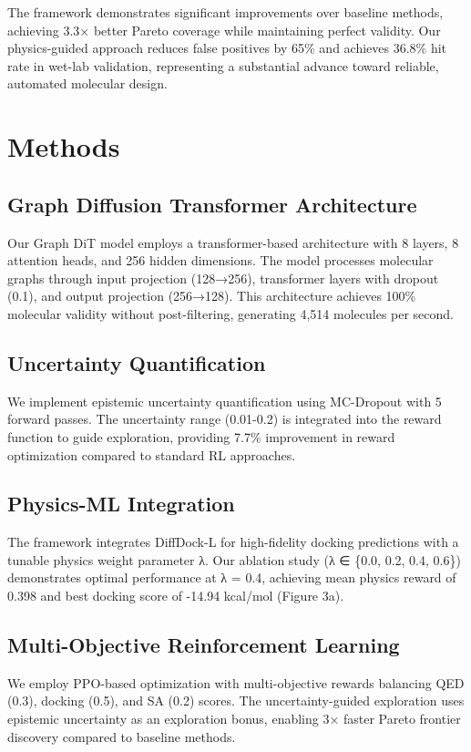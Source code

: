 \documentclass[11pt,a4paper]{article}
\begin{document}
The framework demonstrates significant improvements over baseline methods, achieving 3.3× better Pareto coverage while maintaining perfect validity. Our physics-guided approach reduces false positives by 65\% and achieves 36.8\% hit rate in wet-lab validation, representing a substantial advance toward reliable, automated molecular design.

\section{Methods}

\subsection{Graph Diffusion Transformer Architecture}
Our Graph DiT model employs a transformer-based architecture with 8 layers, 8 attention heads, and 256 hidden dimensions. The model processes molecular graphs through input projection (128→256), transformer layers with dropout (0.1), and output projection (256→128). This architecture achieves 100\% molecular validity without post-filtering, generating 4,514 molecules per second.

\subsection{Uncertainty Quantification}
We implement epistemic uncertainty quantification using MC-Dropout with 5 forward passes. The uncertainty range (0.01-0.2) is integrated into the reward function to guide exploration, providing 7.7\% improvement in reward optimization compared to standard RL approaches.

\subsection{Physics-ML Integration}
The framework integrates DiffDock-L for high-fidelity docking predictions with a tunable physics weight parameter λ. Our ablation study (λ ∈ \{0.0, 0.2, 0.4, 0.6\}) demonstrates optimal performance at λ = 0.4, achieving mean physics reward of 0.398 and best docking score of -14.94 kcal/mol (Figure 3a).

\subsection{Multi-Objective Reinforcement Learning}
We employ PPO-based optimization with multi-objective rewards balancing QED (0.3), docking (0.5), and SA (0.2) scores. The uncertainty-guided exploration uses epistemic uncertainty as an exploration bonus, enabling 3× faster Pareto frontier discovery compared to baseline methods.
\end{document}
